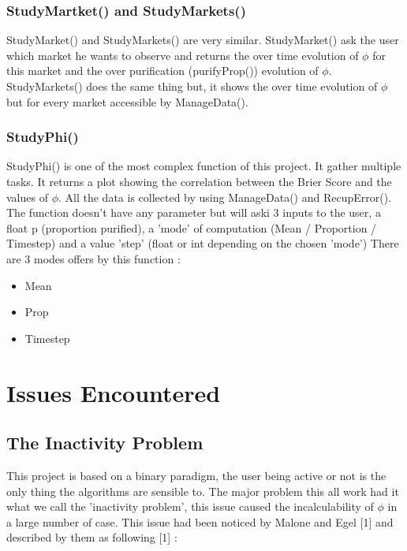 \documentclass{report}
\begin{document}
\subsection{StudyMartket() and StudyMarkets()}

StudyMarket() and StudyMarkets() are very similar. StudyMarket() ask the user which market he wants to observe and returns the over time evolution of $\phi $ for this market and the over purification (purifyProp()) evolution of $\phi $.\\
StudyMarkets() does the same thing but, it shows the over time evolution of $\phi $ but for every market accessible by ManageData().

\subsection{StudyPhi()}

StudyPhi() is one of the most complex function of this project. It gather multiple tasks. It returns a plot showing the correlation between the Brier Score and the values of $\phi $. All the data is collected by using ManageData() and RecupError(). The function doesn't have any parameter but will aski 3 inputs to the user, a float p (proportion purified), a 'mode' of computation (Mean / Proportion / Timestep) and a value 'step' (float or int depending on the chosen 'mode') There are 3 modes offers by this function :
\begin{itemize}
\item Mean
\item Prop
\item Timestep
\end{itemize}



\chapter{Issues Encountered}
\section{The Inactivity Problem}

This project is based on a binary paradigm, the user being active or not is the only thing the algorithms are sensible to. The major problem this all work had it what we call the 'inactivity problem', this issue caused the incalculability of $\phi $ in a large number of case. This issue had been noticed by Malone and Egel [1] and described by them as following [1] : 
\end{document}
